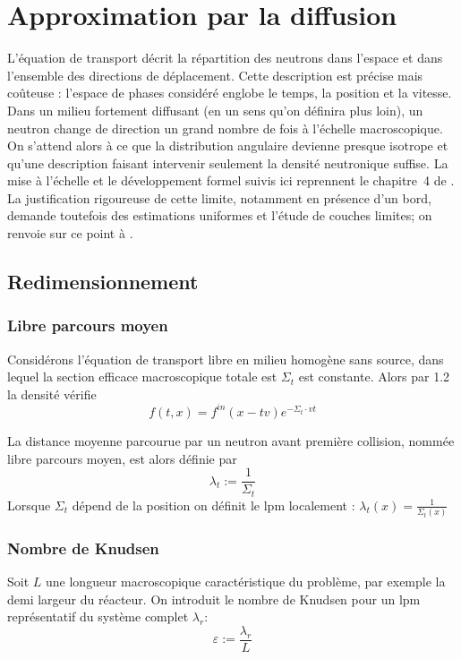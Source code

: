 \documentclass{article}
\begin{document}
\newpage

\section{Approximation par la diffusion}

L'équation de transport décrit la répartition des neutrons dans l'espace et dans l'ensemble des directions de déplacement. Cette description est précise mais coûteuse : l'espace de phases considéré englobe le temps, la position et la vitesse. \\

Dans un milieu fortement diffusant (en un sens qu'on définira plus loin), un neutron change de direction un grand nombre de fois à l'échelle macroscopique.\\
On s'attend alors à ce que la distribution angulaire devienne presque isotrope et qu'une description faisant intervenir seulement la densité neutronique suffise. La mise à l'échelle et le développement formel suivis ici reprennent le chapitre~4 de \textcite{Allaire2018}. La justification rigoureuse de cette limite, notamment en présence d'un bord, demande toutefois des estimations uniformes et l'étude de couches limites; on renvoie sur ce point à \textcite{Bardos1984}.
\subsection{Redimensionnement }
\subsubsection{Libre parcours moyen}
Considérons l'équation de transport libre en milieu homogène sans source, dans lequel la section efficace macroscopique totale est \(\Sigma_t\) est constante. Alors par 1.2 la densité vérifie 
\[f(t,x) = f^{in}(x-tv)e^{-\Sigma_t\cdot vt}\]

La distance moyenne parcourue par un neutron avant première collision, nommée libre parcours moyen, est alors définie par 
\begin{equation}
    \lambda_t := \frac{1}{\Sigma_t}
\end{equation}
Lorsque \(\Sigma_t\) dépend de la position on définit le lpm localement : \( \lambda_t(x)= \frac{1}{\Sigma_t(x)}\)

\subsubsection{Nombre de Knudsen}
Soit \(L\) une longueur macroscopique caractéristique du problème, par exemple la demi largeur du réacteur. On introduit le nombre de Knudsen pour un lpm représentatif du système complet \(\lambda_{r}\):
\[
\varepsilon := \frac{\lambda_r}{L}
\]
\end{document}
